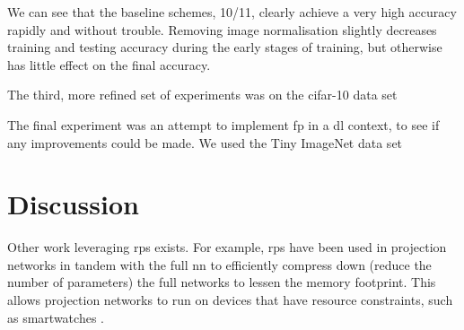 We can see that the baseline schemes, 10/11, clearly achieve a very high accuracy rapidly and without trouble. Removing image normalisation slightly decreases training and testing accuracy during the early stages of training, but otherwise has little effect on the final accuracy.

The third, more refined set of experiments was on the \gls{cifar}-10 data set

The final experiment was an attempt to implement \gls{fp} in a \gls{dl} context, to see if any improvements could be made. We used the Tiny ImageNet data set

\section{Discussion}

Other work leveraging \gls{rp}s exists. For example, \gls{rp}s have been used in projection networks in tandem with the full \gls{nn} to efficiently compress down (reduce the number of parameters) the full networks to lessen the memory footprint. This allows projection networks to run on devices that have resource constraints, such as smartwatches \cite{projection_net}. 


